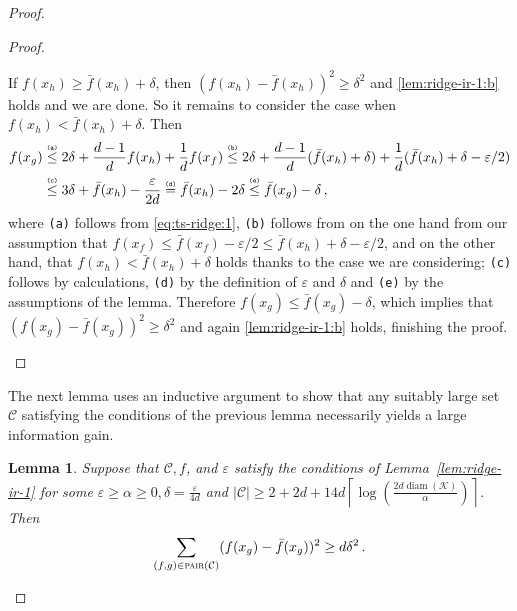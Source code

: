 \documentclass[letter, 12pt]{report}
\newcommand{\ceil}[1]{\left\lceil #1 \right\rceil}
\newcommand{\pair}{\operatorname{\textsc{pair}}}
\newcommand{\explan}[1]{\stackrel{\text{\tiny \texttt{#1}}}}
\newcommand{\cK}{\mathcal K}
\newcommand{\cC}{\mathcal C}
\newcommand{\diam}{\operatorname{diam}}
\newcommand{\1}{\mathbf{1}}
\renewcommand{\epsilon}{\varepsilon}
\theoremstyle{plain}
\newtheorem{lemma}[theorem]{Lemma}
\theoremstyle{definition}
\theoremstyle{remark}
\begin{document}
\begin{proof}
\begin{proof}
\begin{enumcases}
            If $f(x_h) \geq \bar f(x_h) + \delta$, then $(f(x_h) - \bar f(x_h))^2 \geq \delta^2$ and \ref{lem:ridge-ir-1:b} holds and we are done.
            So it remains to consider the case when $f(x_h) < \bar f(x_h) + \delta$.
            Then
            \begin{align*}
                f(x_g)
                 & \explan{(a)}\leq 2 \delta + \frac{d-1}{d} f(x_h) + \frac{1}{d} f(x_f)
                \explan{(b)}\leq 2 \delta + \frac{d-1}{d} (\bar f(x_h) + \delta) + \frac{1}{d} (\bar f(x_h) + \delta - \epsilon / 2) \\
                 & \explan{(c)}\leq 3 \delta + \bar f(x_h) - \frac{\epsilon}{2d}
                \explan{(d)}= \bar f(x_h) - 2\delta
                \explan{(e)}\leq \bar f(x_g) - \delta \,,
            \end{align*}
            where \texttt{(a)} follows from \cref{eq:ts-ridge:1},
            \texttt{(b)} follows from on the one hand from our assumption that
            $f(x_f) \leq \bar f(x_f) - \epsilon/2 \leq \bar f(x_h) + \delta - \epsilon/2$, and on the other hand, that $f(x_h) < \bar f(x_h) + \delta$ holds thanks to the case we are considering;
            \texttt{(c)} follows by calculations,
            \texttt{(d)} by the definition of $\epsilon$ and $\delta$
            and \texttt{(e)} by the assumptions of the lemma.
            Therefore $f(x_g) \leq \bar f(x_g) - \delta$,
            which implies that $(f(x_g) - \bar f(x_g))^2 \geq \delta^2$ and again \ref{lem:ridge-ir-1:b} holds, finishing the proof.
        \end{enumcases}
    \end{proof}

    The next lemma uses an inductive argument to show that any suitably large set $\cC$ satisfying the conditions of the previous lemma necessarily
    yields a large information gain.

    \begin{lemma}\label{lem:ridge-ir-2}
        Suppose that $\cC, f$, and $\epsilon$ satisfy the conditions of Lemma~\ref{lem:ridge-ir-1} for some $\epsilon \geq \alpha \geq 0, \delta = \tfrac{\epsilon}{4d}$ and $|\cC| \geq 2 + 2d + 14 d \ceil{\log\left(\frac{2d \diam(\cK)}{\alpha}\right)}$.
        Then
        \begin{align*}
            \sum_{(f,g) \in \pair(\cC)} (f(x_g) - \bar f(x_g))^2 \geq d \delta^2 \,.
        \end{align*}
    \end{lemma}


\end{proof}
\end{document}
